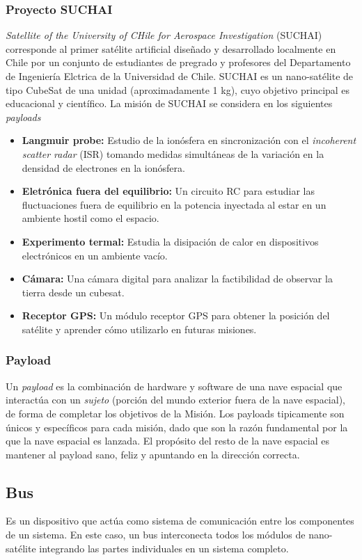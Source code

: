 \subsubsection{Proyecto SUCHAI}
\textit{Satellite of the University of CHile for Aerospace Investigation} (SUCHAI) corresponde al primer sat\'elite artificial diseñado y desarrollado localmente en Chile por un conjunto de estudiantes de pregrado y profesores del Departamento de Ingeniería Elctrica de la Universidad de Chile.
SUCHAI es un nano-sat\'elite de tipo CubeSat de una unidad (aproximadamente 1 kg), cuyo objetivo principal es educacional y científico.
La misión de SUCHAI se considera en los siguientes \textit{payloads}
\begin{itemize}
	\item \textbf{Langmuir probe: } Estudio de la ionósfera en sincronización con el \textit{incoherent scatter radar} (ISR) tomando medidas simultáneas de la variación en la densidad de electrones en la ionósfera.
	\item \textbf{Eletrónica fuera del equilibrio: } Un circuito RC para estudiar las fluctuaciones fuera de equilibrio en la potencia inyectada al estar en un ambiente hostil como el espacio.
	\item \textbf{Experimento termal: } Estudia la disipación de calor en dispositivos electrónicos en un ambiente vacío.
	\item \textbf{Cámara: } Una cámara digital para analizar la factibilidad de observar la tierra desde un cubesat.
	\item \textbf{Receptor GPS: } Un módulo receptor GPS para obtener la posición del sat\'elite y aprender cómo utilizarlo en futuras misiones.
\end{itemize}

\subsubsection{Payload}
Un \textit{payload} es la combinación de hardware y software de una nave espacial que interactúa con un \textit{sujeto} (porción del mundo exterior fuera de la nave espacial), de forma de completar los objetivos de la Misión. Los payloads tipicamente son únicos y específicos para cada misión, dado que son la razón fundamental por la que la nave espacial es lanzada. El propósito del resto de la nave espacial es mantener al payload sano, feliz y apuntando en la dirección correcta.
\subsection{Bus}
Es un dispositivo que actúa como sistema de comunicación entre los componentes de un sistema. En este caso, un bus interconecta todos los módulos de nano-sat\'elite integrando las partes individuales en un sistema completo.

